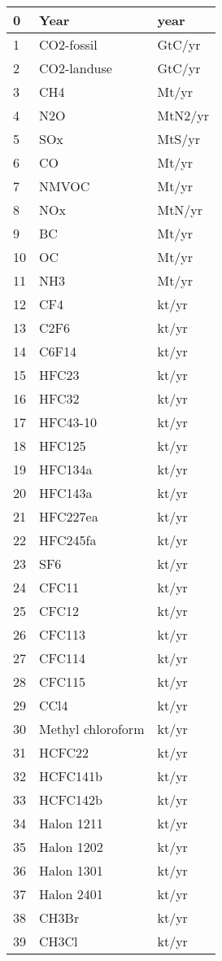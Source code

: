 \documentclass[letterpaper,10pt,english]{sphinxmanual}
\begin{document}
\begin{longtable}{|l|l|l|}
0
&
Year
&
year
\\
\hline
1
&
CO2-fossil
&
GtC/yr
\\
\hline
2
&
CO2-landuse
&
GtC/yr
\\
\hline
3
&
CH4
&
Mt/yr
\\
\hline
4
&
N2O
&
MtN2/yr
\\
\hline
5
&
SOx
&
MtS/yr
\\
\hline
6
&
CO
&
Mt/yr
\\
\hline
7
&
NMVOC
&
Mt/yr
\\
\hline
8
&
NOx
&
MtN/yr
\\
\hline
9
&
BC
&
Mt/yr
\\
\hline
10
&
OC
&
Mt/yr
\\
\hline
11
&
NH3
&
Mt/yr
\\
\hline
12
&
CF4
&
kt/yr
\\
\hline
13
&
C2F6
&
kt/yr
\\
\hline
14
&
C6F14
&
kt/yr
\\
\hline
15
&
HFC23
&
kt/yr
\\
\hline
16
&
HFC32
&
kt/yr
\\
\hline
17
&
HFC43-10
&
kt/yr
\\
\hline
18
&
HFC125
&
kt/yr
\\
\hline
19
&
HFC134a
&
kt/yr
\\
\hline
20
&
HFC143a
&
kt/yr
\\
\hline
21
&
HFC227ea
&
kt/yr
\\
\hline
22
&
HFC245fa
&
kt/yr
\\
\hline
23
&
SF6
&
kt/yr
\\
\hline
24
&
CFC11
&
kt/yr
\\
\hline
25
&
CFC12
&
kt/yr
\\
\hline
26
&
CFC113
&
kt/yr
\\
\hline
27
&
CFC114
&
kt/yr
\\
\hline
28
&
CFC115
&
kt/yr
\\
\hline
29
&
CCl4
&
kt/yr
\\
\hline
30
&
Methyl chloroform
&
kt/yr
\\
\hline
31
&
HCFC22
&
kt/yr
\\
\hline
32
&
HCFC141b
&
kt/yr
\\
\hline
33
&
HCFC142b
&
kt/yr
\\
\hline
34
&
Halon 1211
&
kt/yr
\\
\hline
35
&
Halon 1202
&
kt/yr
\\
\hline
36
&
Halon 1301
&
kt/yr
\\
\hline
37
&
Halon 2401
&
kt/yr
\\
\hline
38
&
CH3Br
&
kt/yr
\\
\hline
39
&
CH3Cl
&
kt/yr
\\
\hline\end{longtable}
\end{document}
